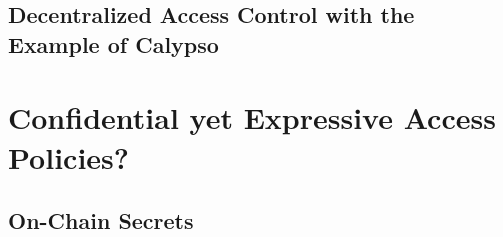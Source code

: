 \documentclass[conference]{IEEEtran}
\begin{document}
\subsection{Decentralized Access Control with the Example of Calypso}

\section{Confidential yet Expressive Access Policies?}

\subsection{On-Chain Secrets}




\end{document}
